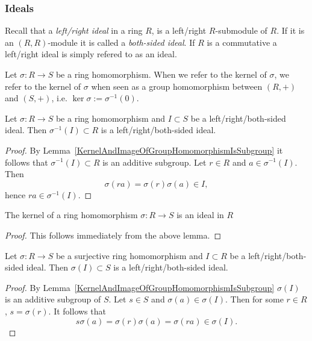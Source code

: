 \subsubsection{Ideals}
\begin{definition}
    Recall that a \textit{left/right ideal} in a ring $R$, is a left/right $R$-submodule of $R$. If it is an $(R,R)$-module it is called a \textit{both-sided ideal}. If $R$ is a commutative a left/right ideal is simply refered to as an ideal.   
\end{definition}
\begin{definition}
    Let $\sigma : R \rightarrow S$ be a ring homomorphism. When we refer to the kernel of $\sigma$, we refer to the kernel of $\sigma$ when seen as a group homomorphism between $(R,+)$ and $(S,+)$, i.e. $\ker \sigma := \sigma^{-1}(0).$
\end{definition}
\begin{lemma}
    Let $\sigma : R \rightarrow S$ be a ring homomorphism and $I \subset S$ be a left/right/both-sided ideal. Then $\sigma^{-1}(I)\subset R$ is a left/right/both-sided ideal. 
\end{lemma}
\begin{proof}
    By Lemma~\ref{KernelAndImageOfGroupHomomorphismIsSubgroup}  it follows that $\sigma^{-1}(I)\subset R$ is an additive subgroup. Let $r\in R$ and $a\in \sigma^{-1}(I)$. Then
    $$\sigma(ra)=\sigma(r)\sigma(a)\in I,$$
    hence $ra \in \sigma^{-1}(I)$.
\end{proof}
\begin{corollary}\label{TheKernelOfARingHomomorphismIsAnIdeal}
    The kernel of a ring homomorphism $\sigma : R \rightarrow S$ is an ideal in $R$
\end{corollary}
\begin{proof}
    This follows immediately from the above lemma. 
\end{proof}
\begin{lemma}\label{ImageOfSurjectiveRingHomOfIdealIsIdeal}
    Let $\sigma : R \rightarrow S$ be a surjective ring homomorphism and $I\subset R$ be a left/right/both-sided ideal. Then $\sigma(I)\subset S$ is a left/right/both-sided ideal. 
\end{lemma}
\begin{proof}
     By Lemma~\ref{KernelAndImageOfGroupHomomorphismIsSubgroup} $\sigma(I)$ is an additive subgroup of $S$. Let $s\in S$ and $\sigma(a)\in \sigma(I)$. Then for some $r\in R$, $s = \sigma(r)$. It follows that 
     $$s\sigma(a) = \sigma(r)\sigma(a)=\sigma(ra)\in \sigma(I).$$
\end{proof}
